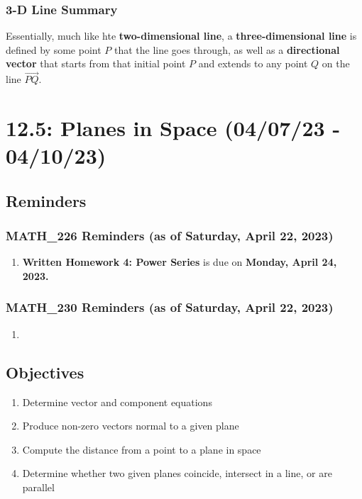 \documentclass{report}
\begin{document}
\begin{sloppypar}
\begin{itemize}
\end{itemize}
\subsection{3-D Line Summary}
Essentially, much like hte \textbf{two-dimensional line},
a \textbf{three-dimensional line} is defined by some
point $ P $ that the line goes through, as well as
a \textbf{directional vector} that starts from that
initial point $ P $ and extends to any point $ Q $ on
the line $ \overrightarrow{PQ} $.


\chapter{12.5: Planes in Space (04/07/23 - 04/10/23)}
\section{Reminders}
\subsection{MATH\_226 Reminders (as of Saturday, April 22, 2023)}
\begin{enumerate}
  \item \textbf{Written Homework 4: Power Series} is
        due on \textbf{Monday, April 24, 2023.}
\end{enumerate}

\subsection{MATH\_230 Reminders (as of Saturday, April 22,
  2023)}
\begin{enumerate}
  \item
\end{enumerate}

\section{Objectives}
\begin{enumerate}
  \item Determine vector and component equations
  \item Produce non-zero vectors normal to a given plane
  \item Compute the distance from a point to a plane
        in space
  \item Determine whether two given planes coincide, intersect in a line, or are parallel


\end{enumerate}
\end{sloppypar}
\end{document}
